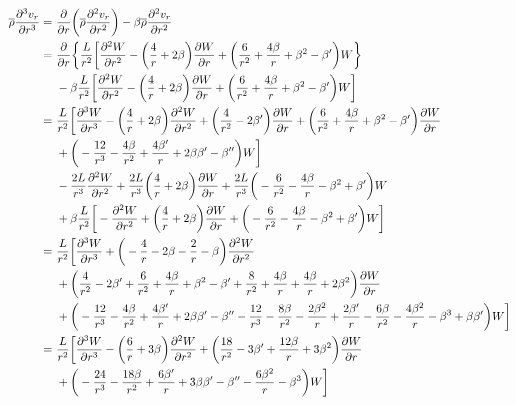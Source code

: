 \documentclass[12pt]{article} %
\newcommand{\pderiv}[2]{\frac{\partial#1}{\partial#2}}
\newcommand{\ppderiv}[2]{\frac{\partial^2#1}{\partial#2^2}}
\newcommand{\pppderiv}[2]{\frac{\partial^3#1}{\partial#2^3}}
\newcommand{\rhobar}{\overline{\rho}}
\newcommand{\db}{\beta^\prime}
\newcommand{\ddb}{\beta^{\prime\prime}}
\begin{document}
	\begin{align}
	\rhobar\pppderiv{v_r}{r} =\ &\pderiv{}{r}\bigg{(}\rhobar\ppderiv{v_r}{r}\bigg{)}-\beta\rhobar\ppderiv{v_r}{r}\nonumber\\
	=\ &\pderiv{}{r}\bigg{\{}\frac{L}{r^2}\bigg{[}\ppderiv{W}{r} - \bigg{(}\frac{4}{r}+2\beta\bigg{)}\pderiv{W}{r} + \bigg{(}\frac{6}{r^2}+\frac{4\beta}{r}+\beta^2-\db\bigg{)}W\bigg{\}}\nonumber\\
	&- \beta \frac{L}{r^2}\bigg{[}\ppderiv{W}{r}-\bigg{(}\frac{4}{r}+2\beta\bigg{)}\pderiv{W}{r} +\bigg{(}\frac{6}{r^2}+\frac{4\beta}{r}+\beta^2-\db\bigg{)}W\bigg{]}\nonumber\\
	=\ &\frac{L}{r^2}\bigg{[}\pppderiv{W}{r} - \bigg{(}\frac{4}{r}+2\beta\bigg{)}\ppderiv{W}{r}  +\bigg{(}\frac{4}{r^2} -2\db\bigg{)}\pderiv{W}{r} + \bigg{(}\frac{6}{r^2}+\frac{4\beta}{r}+\beta^2-\db\bigg{)}\pderiv{W}{r}\nonumber\\
	&+ \bigg{(}-\frac{12}{r^3}-\frac{4\beta}{r^2}+\frac{4\db}{r} + 2\beta\db - \ddb\bigg{)}W\bigg{]}\nonumber\\
	 &-\frac{2L}{r^3}\ppderiv{W}{r} + \frac{2L}{r^3}\bigg{(}\frac{4}{r}+2\beta\bigg{)}\pderiv{W}{r} + \frac{2L}{r^3}\bigg{(}-\frac{6}{r^2}-\frac{4\beta}{r}-\beta^2+\db\bigg{)}W\nonumber\\
	 &+ \beta\frac{L}{r^2}\bigg{[}-\ppderiv{W}{r}+\bigg{(}\frac{4}{r}+2\beta\bigg{)}\pderiv{W}{r} +
			\bigg{(}-\frac{6}{r^2} - \frac{4\beta}{r} - \beta^2 + \db\bigg{)}W\bigg{]}\nonumber\\
			=\ &\frac{L}{r^2}\bigg{[}\pppderiv{W}{r} + \bigg{(}-\frac{4}{r}-2\beta - \frac{2}{r}-\beta\bigg{)}\ppderiv{W}{r}\nonumber\\
			&+\bigg{(}\frac{4}{r^2}-2\db + \frac{6}{r^2}+\frac{4\beta}{r}+\beta^2-\db + \frac{8}{r^2}+\frac{4\beta}{r}+\frac{4\beta}{r}+2\beta^2\bigg{)}\pderiv{W}{r}\nonumber\\
			&+\bigg{(}-\frac{12}{r^3}-\frac{4\beta}{r^2} +\frac{4\db}{r} + 2\beta\db - \ddb - \frac{12}{r^3} - \frac{8\beta}{r^2} - \frac{2\beta^2}{r} + \frac{2\db}{r}-\frac{6\beta}{r^2} - \frac{4\beta^2}{r} - \beta^3 + \beta\db\bigg{)}W\bigg{]}\nonumber\\
	=\ &\frac{L}{r^2}\bigg{[}\pppderiv{W}{r} -\bigg{(}\frac{6}{r}+3\beta \bigg{)}\ppderiv{W}{r} + \bigg{(}\frac{18}{r^2}-3\db + \frac{12\beta}{r} + 3\beta^2\bigg{)}\pderiv{W}{r}\nonumber\\
     \label{eq:rhod3vr_from_W}     &+\bigg{(}-\frac{24}{r^3} - \frac{18\beta}{r^2} + \frac{6\db}{r}+3\beta\db-\ddb - \frac{6\beta^2}{r} - \beta^3\bigg{)}W\bigg{]}
	\end{align}
\end{document}
